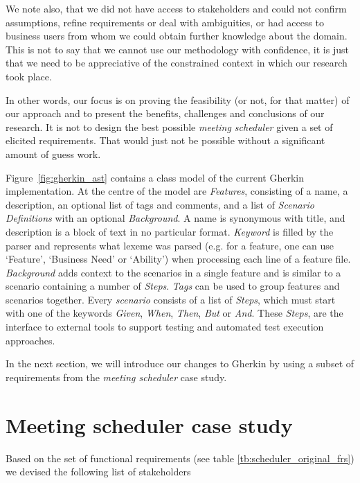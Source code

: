 \documentclass[dissertation,final]{softeng}
\begin{document}
We note also, that we did not have access to stakeholders and could not confirm assumptions, refine requirements or deal with ambiguities, or had access to business users from whom we could obtain further knowledge about the domain. This is not to say that we cannot use our methodology with confidence, it is just that we need to be appreciative of the constrained context in which our research took place.

In other words, our focus is on proving the feasibility (or not, for that matter) of our approach and to present the benefits, challenges and conclusions of our research. It is not to design the best possible \emph{meeting scheduler} given a set of elicited requirements. That would just not be possible without a significant amount of guess work. 

Figure~\ref{fig:gherkin_ast} contains a class model of the current Gherkin implementation. At the centre of the model are \emph{Features}, consisting of a name, a description, an optional list of tags and comments, and a list of \emph{Scenario Definitions} with an optional \emph{Background}. A name is synonymous with title, and description is a block of text in no particular format. \emph{Keyword} is filled by the parser and represents what lexeme was parsed (e.g. for a feature, one can use `Feature', `Business Need' or `Ability') when processing each line of a feature file. \emph{Background} adds context to the scenarios in a single feature and is similar to a scenario containing a number of \emph{Steps}. \emph{Tags} can be used to group features and scenarios together. Every \emph{scenario} consists of a list of \emph{Steps}, which must start with one of the keywords \emph{Given}, \emph{When}, \emph{Then}, \emph{But} or \emph{And}. These \emph{Steps}, are the interface to external tools to support testing and automated test execution approaches.

In the next section, we will introduce our changes to Gherkin by using a subset of requirements from the \emph{meeting scheduler} case study.

\section{Meeting scheduler case study}
\label{sec:case_study}
Based on the set of functional requirements (see table \ref{tb:scheduler_original_frs}) we devised the following list of stakeholders
\end{document}

